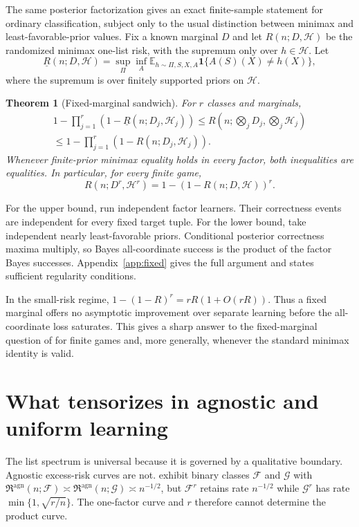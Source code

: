 \documentclass{article}
\newtheorem{theorem}{Theorem}
\theoremstyle{definition}
\theoremstyle{remark}
\newcommand{\E}{\mathbb E}
\newcommand{\cH}{\mathcal H}
\newcommand{\cF}{\mathcal F}
\newcommand{\cG}{\mathcal G}
\newcommand{\Risk}{\mathfrak R}
\newcommand{\1}{\mathbf 1}
\begin{document}
The same posterior factorization gives an exact finite-sample statement for ordinary classification, subject only to the usual distinction between minimax and least-favorable-prior values. Fix a known marginal \(D\) and let \(R(n;D,\cH)\) be the randomized minimax one-list risk, with the supremum only over \(h\in\cH\). Let \[ \underline R(n;D,\cH) =\sup_{\Pi}\inf_A\E_{h\sim\Pi,S,X,A}\1\{A(S)(X)\ne h(X)\}, \] where the supremum is over finitely supported priors on \(\cH\).

\begin{theorem}[Fixed-marginal sandwich]
\label{thm:fixed}
For \(r\) classes and marginals,
\begin{multline}
1-\prod_{j=1}^r\left(1-\underline R(n;D_j,\cH_j)\right)
\le R\!\left(n;\bigotimes_jD_j,\bigotimes_j\cH_j\right)\\
\le1-\prod_{j=1}^r\left(1-R(n;D_j,\cH_j)\right).
\label{eq:fixed-sandwich}
\end{multline}
Whenever finite-prior minimax equality holds in every factor, both inequalities are equalities. In particular, for every finite game, \[ R(n;D^r,\cH^r)=1-\left(1-R(n;D,\cH)\right)^r. \]
\end{theorem}

For the upper bound, run independent factor learners. Their correctness events are independent for every fixed target tuple. For the lower bound, take independent nearly least-favorable priors. Conditional posterior correctness maxima multiply, so Bayes all-coordinate success is the product of the factor Bayes successes. Appendix~\ref{app:fixed} gives the full argument and states sufficient regularity conditions.

In the small-risk regime, \(1-(1-R)^r=rR(1+O(rR))\). Thus a fixed marginal offers no asymptotic improvement over separate learning before the all-coordinate loss saturates. This gives a sharp answer to the fixed-marginal question of \citet{hanneke2024direct} for finite games and, more generally, whenever the standard minimax identity is valid.

\section{What tensorizes in agnostic and uniform learning}
\label{sec:rates}

The list spectrum is universal because it is governed by a qualitative boundary. Agnostic excess-risk curves are not. \citet{more2026separation} exhibit binary classes \(\cF\) and \(\cG\) with \(\Risk^{\mathrm{agn}}(n;\cF)\asymp\Risk^{\mathrm{agn}}(n;\cG)\asymp n^{-1/2}\), but \(\cF^r\) retains rate \(n^{-1/2}\) while \(\cG^r\) has rate \(\min\{1,\sqrt{r/n}\}\). The one-factor curve and \(r\) therefore cannot determine the product curve.
\end{document}
